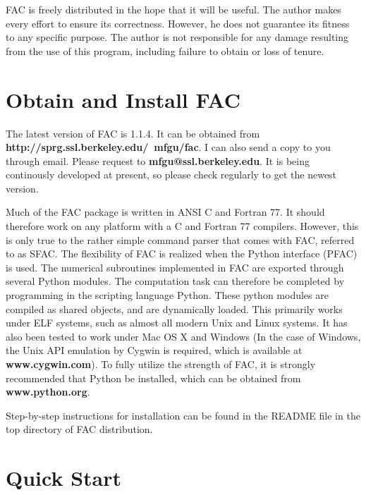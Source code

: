 \documentclass[twoside,letterpaper]{refrep}
\newcommand{\facversion}{{1.1.4}\xspace}
\begin{document}
FAC is freely distributed in the hope that it will be useful. The author makes
every effort to ensure its correctness. However, he does not guarantee its
fitness to any specific purpose. The author is not responsible for any damage
resulting from the use of this program, including failure to obtain or loss of
tenure. 

\section{Obtain and Install FAC}
\label{sec:install}
The latest version of FAC is \facversion. It can be obtained from
\textbf{http://sprg.ssl.berkeley.edu/~mfgu/fac}. I can also send a copy to you
through email. Please request to \textbf{mfgu@ssl.berkeley.edu}. It is being
continously developed at present, so please check regularly to get the newest
version.

Much of the FAC package is written in ANSI C and Fortran 77. It should 
therefore work on any platform with a C and Fortran 77 compilers. However, 
this is only true to the rather simple command parser that comes with FAC,
referred  
to as SFAC. The flexibility of FAC is realized when the Python interface
(PFAC) is used. The numerical subroutines implemented in FAC are exported
through several Python modules. The computation task can therefore be
completed by programming in the scripting language Python. These python
modules are compiled as shared objects, and are dynamically loaded. This
primarily works under ELF systems, such as almost all modern Unix and Linux
systems. It has also been tested to work under Mac OS X and Windows (In the
case of Windows, the Unix API emulation by Cygwin is required, which is
available at \textbf{www.cygwin.com}). To fully utilize the strength of  
FAC, it is strongly recommended that Python be installed, which can be obtained
from \textbf{www.python.org}.

Step-by-step instructions for installation can be found in the README file in
the top directory of FAC distribution.

\section{Quick Start}
\label{sec:start}
\end{document}
